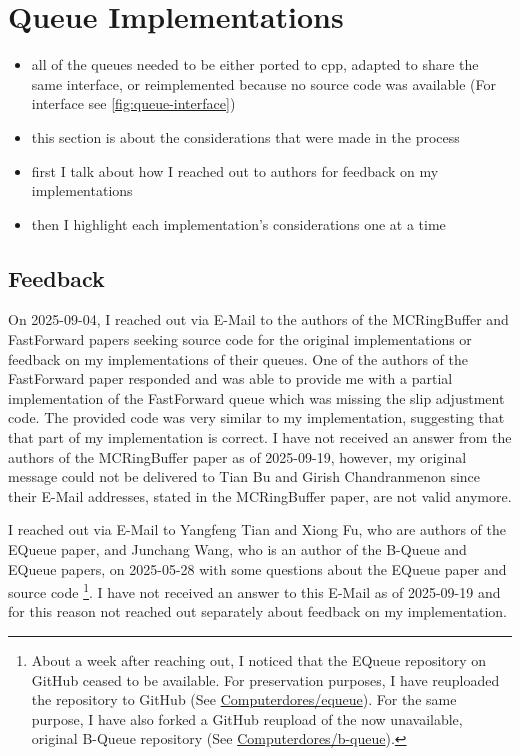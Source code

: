 \section{Queue Implementations}

\begin{itemize}
    \item all of the queues needed to be either ported to cpp, adapted to share the same interface, or
        reimplemented because no source code was available (For interface see \autoref{fig:queue-interface})
    \item this section is about the considerations that were made in the process
    \item first I talk about how I reached out to authors for feedback on my implementations
    \item then I highlight each implementation's considerations one at a time
\end{itemize}

\subsection{Feedback}
On 2025-09-04, I reached out via E-Mail to the authors of the MCRingBuffer and FastForward papers seeking
source code for the original implementations or feedback on my implementations of their queues.
One of the authors of the FastForward paper responded and was able to provide me with a partial
implementation of the FastForward queue which was missing the slip adjustment code.
The provided code was very similar to my implementation, suggesting that that part of my implementation is correct.
I have not received an answer from the authors of the MCRingBuffer paper as of 2025-09-19, however, my
original message could not be delivered to Tian Bu and Girish Chandranmenon since their E-Mail addresses,
stated in the MCRingBuffer paper, are not valid anymore.

I reached out via E-Mail to Yangfeng Tian and Xiong Fu, who are authors of the EQueue paper, and Junchang
Wang, who is an author of the B-Queue and EQueue papers, on 2025-05-28 with some questions about the EQueue
paper and source code
\footnote{About a week after reaching out, I noticed that the EQueue repository on GitHub ceased to be available.
For preservation purposes, I have reuploaded the repository to GitHub (See \href{https://github.com/Computerdores/equeue}{Computerdores/equeue}).
For the same purpose, I have also forked a GitHub reupload of the now unavailable, original B-Queue repository (See \href{https://github.com/Computerdores/b-queue}{Computerdores/b-queue}).}.
I have not received an answer to this E-Mail as of 2025-09-19 and for this reason not reached out separately
about feedback on my implementation.

